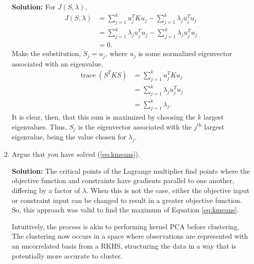 \documentclass{article}[12pt]
\begin{document}
\begin{enumerate}

	 \textbf{Solution: } For $J(S, \lambda)$,
	 \begin{equation}
		 \begin{aligned}
			 J(S, \lambda) &= \sum^{k}_{j=1} u_j^T K u_j - \sum^{k}_{j=1} \lambda_j u_j^T u_j   \\
								  &= \sum^{k}_{j=1} \lambda_j u_j^T u_j - \sum^{k}_{j=1} \lambda_j u_j^T u_j  \\  
								  &= 0 .  
		 \end{aligned}
	 \end{equation}
	 Make the substitution, $S_j = u_j$, where $u_j$ is some normalized eigenvector associated with an eigenvalue,
	 \begin{equation}
		 \begin{aligned}
			 \operatorname{trace}(S^T K S) &= \sum^{k}_{j=1} u_j^T K u_j  \\
								  &= \sum^{k}_{j=1} \lambda_j u_j^T u_j \\  
								  &= \sum^{k}_{j=1} \lambda_j .  
		 \end{aligned}
	 \end{equation}
	 It is clear, then, that this sum is maximized by choosing the $k$ largest eigenvalues. Thus, $S_j$ is the eigenvector associated with the $j^{\text{th}}$ largest eigenvalue, being the value chosen for $\lambda_j$.


 \item Argue that you have solved (\ref{eq:kmeans}).

	 \textbf{Solution: } The critical points of the Lagrange multiplier find points where the objective function and constraints have gradients parallel to one another, differing by a factor of $\lambda$. When this is not the case, either the objective input or constraint input can be changed to result in a greater objective function. So, this approach was valid to find the maximum of Equation \ref{eq:kmeans}. 

	 Intuitively, the process is akin to performing kernel PCA before clustering. The clustering now occurs in a space where observations are represented with an uncorrelated basis from a RKHS, structuring the data in a way that is potentially more accurate to cluster.
 

\end{enumerate}
\end{document}
